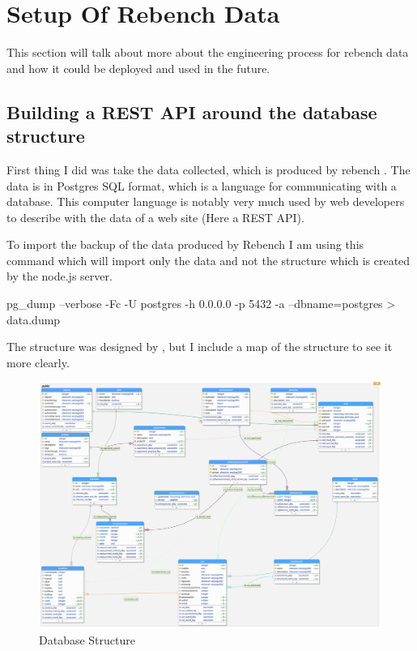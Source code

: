 \documentclass{article}
\begin{document}
\section{Setup Of Rebench Data}
This section will talk about more about the engineering process for rebench data and how it could be deployed and used in the future.\\

\subsection{Building a REST API around the database structure}

First thing I did was take the data collected, which is produced by rebench \cite{ReBench:2018}. The data is in Postgres SQL format, which is a language for communicating with a database. This computer language is notably very much used by web developers to describe with the data of a web site (Here a REST API).

To import the backup of the data produced by Rebench I am using this command which will import only the data and not the structure which is created by the node.js server.

\begin{python}[h!]
pg_dump --verbose -Fc -U postgres -h 0.0.0.0 -p 5432  -a --dbname=postgres > data.dump
\end{python}

The structure was designed by \cite{ReBench:2018}, but I include a map of the structure to see it more clearly.


\begin{figure}[h!]
    \centering
    \includegraphics[width=1\textwidth]{images/database.png}
    \caption{Database Structure}
    \label{fig:database}
\end{figure}
\end{document}
